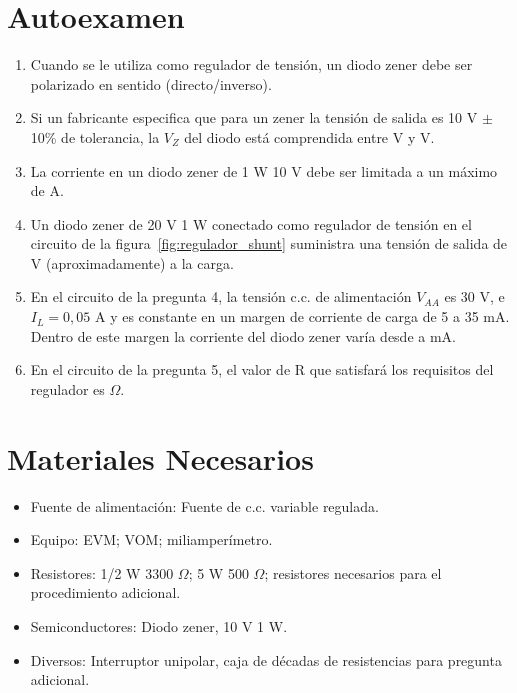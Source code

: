 \documentclass[12pt,a4paper]{article}
\begin{document}
\section*{Autoexamen}
\begin{enumerate}
    \item Cuando se le utiliza como regulador de tensión, un diodo zener debe ser polarizado en sentido \underline{\hspace{1.5cm}} (directo/inverso).
    \item Si un fabricante especifica que para un zener la tensión de salida es 10 V $\pm$ 10\% de tolerancia, la $V_Z$ del diodo está comprendida entre \underline{\hspace{1cm}} V y \underline{\hspace{1cm}} V.
    \item La corriente en un diodo zener de 1 W 10 V debe ser limitada a un máximo de \underline{\hspace{1cm}} A.
    \item Un diodo zener de 20 V 1 W conectado como regulador de tensión en el circuito de la figura~\ref{fig:regulador_shunt} suministra una tensión de salida de \underline{\hspace{1cm}} V (aproximadamente) a la carga.
    \item En el circuito de la pregunta 4, la tensión c.c. de alimentación $V_{AA}$ es 30 V, e $I_L = 0,05$ A y es constante en un margen de corriente de carga de 5 a 35 mA. Dentro de este margen la corriente del diodo zener varía desde \underline{\hspace{1cm}} a \underline{\hspace{1cm}} mA.
    \item En el circuito de la pregunta 5, el valor de R que satisfará los requisitos del regulador es \underline{\hspace{1cm}} $\Omega$.
\end{enumerate}

\section*{Materiales Necesarios}
\begin{itemize}
    \item Fuente de alimentación: Fuente de c.c. variable regulada.
    \item Equipo: EVM; VOM; miliamperímetro.
    \item Resistores: 1/2 W 3300 $\Omega$; 5 W 500 $\Omega$; resistores necesarios para el procedimiento adicional.
    \item Semiconductores: Diodo zener, 10 V 1 W.
    \item Diversos: Interruptor unipolar, caja de décadas de resistencias para pregunta adicional.
\end{itemize}
\end{document}
